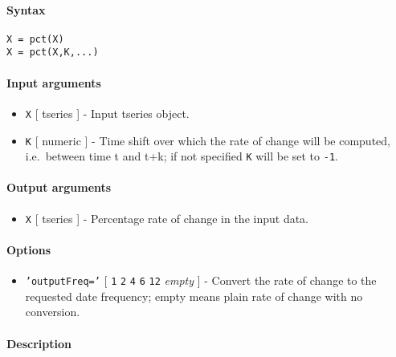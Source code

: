 


	\paragraph{Syntax}\label{syntax}

\begin{verbatim}
X = pct(X)
X = pct(X,K,...)
\end{verbatim}

\paragraph{Input arguments}\label{input-arguments}

\begin{itemize}
\item
  \texttt{X} {[} tseries {]} - Input tseries object.
\item
  \texttt{K} {[} numeric {]} - Time shift over which the rate of change
  will be computed, i.e.~between time t and t+k; if not specified
  \texttt{K} will be set to \texttt{-1}.
\end{itemize}

\paragraph{Output arguments}\label{output-arguments}

\begin{itemize}
\itemsep1pt\parskip0pt
\item
  \texttt{X} {[} tseries {]} - Percentage rate of change in the input
  data.
\end{itemize}

\paragraph{Options}\label{options}

\begin{itemize}
\itemsep1pt\parskip0pt
\item
  \texttt{'outputFreq='} {[} \texttt{1} \textbar{} \texttt{2} \textbar{}
  \texttt{4} \textbar{} \texttt{6} \textbar{} \texttt{12} \textbar{}
  \emph{empty} {]} - Convert the rate of change to the requested date
  frequency; empty means plain rate of change with no conversion.
\end{itemize}

\paragraph{Description}\label{description}

